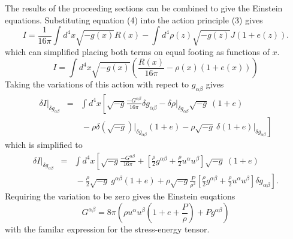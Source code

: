 The results of the proceeding sections can be combined to give the Einstein equations.  Substituting equation (4) into the action principle (3) gives
\begin{equation}
I = \frac{1}{16 \pi} \int d^4x \sqrt{-g(x)} R(x) - \int d^4 \rho(z) \sqrt{-g(z)} J (1+e(z)).
\end{equation}
which can simplified placing both terms on equal footing as functions of $x$.  
\begin{equation}
I = \int d^4x \sqrt{-g(x)} \left( \frac{R(x)}{16 \pi} - \rho(x) (1+e(x)) \right)
\end{equation}
Taking the variations of this action with repect to $g_{\alpha \beta}$ gives
\begin{eqnarray}
\delta I \vert_{\delta g_{\alpha \beta}} 
	&=&
	\int d^4x
	\left[
		\sqrt{-g}\frac{-G^{\alpha \beta}}{16 \pi} 
		\delta g_{\alpha \beta} - \delta \rho \vert_{\delta g_{\alpha
 		\beta}} \sqrt{-g} \ (1+e)
	\right.
	\nonumber \\
	& &
	\left.
		\frac{}{}
		-\rho \delta \left( \sqrt{-g} \right)
 		\vert_{\delta g_{\alpha \beta}}(1+e) - \rho \sqrt{-g} \ \delta(1+e)
		\vert_{\delta g_{\alpha \beta}}
	\right]
\end{eqnarray}
which is simplified to
\begin{eqnarray}
\delta I \vert_{\delta g_{\alpha \beta}} 
	&=&
	\int d^4x
	\left[
		\sqrt{-g}\frac{-G^{\alpha \beta}}{16 \pi} 
		+ \left[ \frac{\rho}{2} g^{\alpha \beta} + \frac{\rho}{2} u^\alpha 
		u^\beta \right] \sqrt{-g} \ (1+e)
	\right.
	\nonumber \\
	& &
	\left.
		\frac{}{}
		- \frac{\rho}{2} \sqrt{-g} \ g^{\alpha \beta} (1+e)  
		+ \rho \sqrt{-g} \frac{P}{\rho^2} \left[ \frac{\rho}{2} 
		g^{\alpha \beta} + \frac{\rho}{2} u^\alpha u^\beta \right] 
		\delta g_{\alpha \beta}
	\right].
\end{eqnarray}
Requiring the variation to be zero gives the Einstein euqations
\begin{equation}
G^{\alpha \beta} = 8 \pi \left( \rho u^\alpha u^\beta (1 + e + \frac{P}{\rho}) + P g^{\alpha \beta} \right)
\end{equation}
with the familar expression for the stress-energy tensor.


